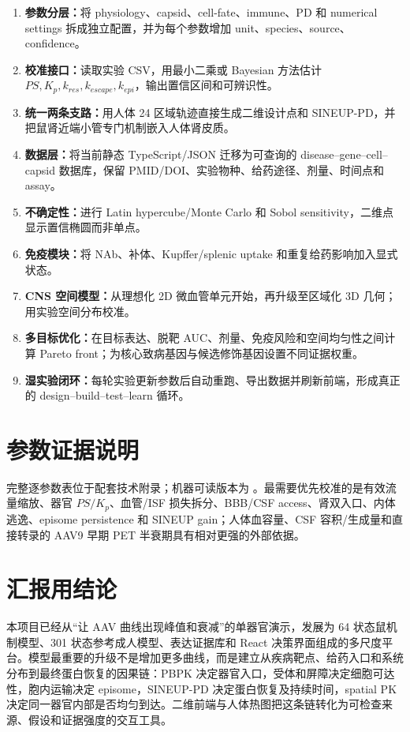 \documentclass[UTF8,11pt,a4paper]{ctexart}
\begin{document}
\begin{enumerate}
  \item \textbf{参数分层：}将 physiology、capsid、cell-fate、immune、PD 和 numerical settings 拆成独立配置，并为每个参数增加 unit、species、source、confidence。
  \item \textbf{校准接口：}读取实验 CSV，用最小二乘或 Bayesian 方法估计 $PS,K_p,k_{res},k_{escape},k_{epi}$，输出置信区间和可辨识性。
  \item \textbf{统一两条支路：}用人体 24 区域轨迹直接生成二维设计点和 SINEUP-PD，并把鼠肾近端小管专门机制嵌入人体肾皮质。
  \item \textbf{数据层：}将当前静态 TypeScript/JSON 迁移为可查询的 disease--gene--cell--capsid 数据库，保留 PMID/DOI、实验物种、给药途径、剂量、时间点和 assay。
  \item \textbf{不确定性：}进行 Latin hypercube/Monte Carlo 和 Sobol sensitivity，二维点显示置信椭圆而非单点。
  \item \textbf{免疫模块：}将 NAb、补体、Kupffer/splenic uptake 和重复给药影响加入显式状态。
  \item \textbf{CNS 空间模型：}从理想化 2D 微血管单元开始，再升级至区域化 3D 几何；用实验空间分布校准。
  \item \textbf{多目标优化：}在目标表达、脱靶 AUC、剂量、免疫风险和空间均匀性之间计算 Pareto front；为核心致病基因与候选修饰基因设置不同证据权重。
  \item \textbf{湿实验闭环：}每轮实验更新参数后自动重跑、导出数据并刷新前端，形成真正的 design--build--test--learn 循环。
\end{enumerate}

\section{参数证据说明}

完整逐参数表位于配套技术附录；机器可读版本为 。最需要优先校准的是有效流量缩放、器官 $PS/K_p$、血管/ISF 损失拆分、BBB/CSF access、肾双入口、内体逃逸、episome persistence 和 SINEUP gain；人体血容量、CSF 容积/生成量和直接转录的 AAV9 早期 PET 半衰期具有相对更强的外部依据。

\section{汇报用结论}

本项目已经从“让 AAV 曲线出现峰值和衰减”的单器官演示，发展为 64 状态鼠机制模型、301 状态参考成人模型、表达证据库和 React 决策界面组成的多尺度平台。模型最重要的升级不是增加更多曲线，而是建立从疾病靶点、给药入口和系统分布到最终蛋白恢复的因果链：PBPK 决定器官入口，受体和屏障决定细胞可达性，胞内运输决定 episome，SINEUP-PD 决定蛋白恢复及持续时间，spatial PK 决定同一器官内部是否均匀到达。二维前端与人体热图把这条链转化为可检查来源、假设和证据强度的交互工具。
\end{document}
